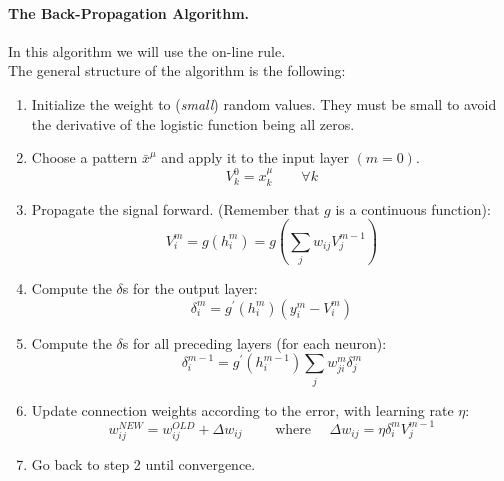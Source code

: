 \paragraph*{The Back-Propagation Algorithm.} In this algorithm we will use the on-line rule.\\
The general structure of the algorithm is the following:
\begin{enumerate}
	\item Initialize the weight to (\textit{small}) random values. They must be small to avoid the derivative of the logistic function being all zeros.
	\item Choose a pattern $\bar{x}^\mu$ and apply it to the input layer $(m=0)$.
	$$V _ { k } ^ { 0 } = x _ { k } ^ { \mu } \qquad \forall k$$
	\item Propagate the signal forward. (Remember that $g$ is a continuous function):
	$$V _ {i} ^ { m } = g \left( h _ { i } ^ { m } \right) = g \left( \sum _ { j } w _ { i j } V _ { j } ^ { m - 1 } \right)$$
	\item Compute the $\delta$s for the output layer:
	$$\delta _ { i } ^ { m } = g ^ { \prime } \left( h _ { i } ^ { m } \right) \left( y _ { i } ^ { m } - V _ { i } ^ { m } \right)$$
	\item Compute the $\delta$s for all preceding layers (for each neuron):
	$$\delta _ { i } ^ { m - 1 } = g ^ { \prime } \left( h _ { i } ^ { m - 1 } \right) \sum _ { j } w _ { j i } ^ { m } \delta _ { j } ^ { m }$$
	\item Update connection weights according to the error, with learning rate $\eta$:
	$$w _ { i j } ^ { N E W } = w _ { i j } ^ { O L D } + \Delta w _ { i j } \qquad \text { where } \quad \Delta w _ { i j } = \eta \delta _ { i } ^ { m } V _ { j } ^ { m - 1 }$$
	\item Go back to step 2 until convergence.
\end{enumerate}

